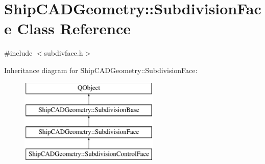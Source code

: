 \hypertarget{classShipCADGeometry_1_1SubdivisionFace}{\section{Ship\-C\-A\-D\-Geometry\-:\-:Subdivision\-Face Class Reference}
\label{classShipCADGeometry_1_1SubdivisionFace}
}


{\ttfamily \#include $<$subdivface.\-h$>$}

Inheritance diagram for Ship\-C\-A\-D\-Geometry\-:\-:Subdivision\-Face\-:\begin{figure}[H]
\begin{center}
\leavevmode
\includegraphics[height=4.000000cm]{classShipCADGeometry_1_1SubdivisionFace}
\end{center}
\end{figure}
